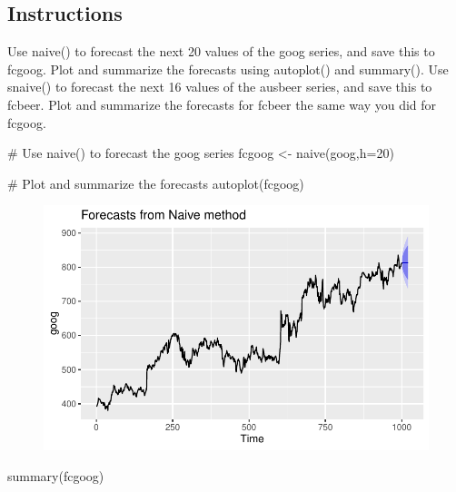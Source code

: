 \documentclass[
  letterpaper,
  DIV=11,
  numbers=noendperiod]{scrartcl}
\newenvironment{Shaded}{\begin{snugshade}}{\end{snugshade}}
\newcommand{\AttributeTok}[1]{\textcolor[rgb]{0.40,0.45,0.13}{#1}}
\newcommand{\CommentTok}[1]{\textcolor[rgb]{0.37,0.37,0.37}{#1}}
\newcommand{\DecValTok}[1]{\textcolor[rgb]{0.68,0.00,0.00}{#1}}
\newcommand{\FunctionTok}[1]{\textcolor[rgb]{0.28,0.35,0.67}{#1}}
\newcommand{\NormalTok}[1]{\textcolor[rgb]{0.00,0.23,0.31}{#1}}
\newcommand{\OtherTok}[1]{\textcolor[rgb]{0.00,0.23,0.31}{#1}}
\begin{document}
\hypertarget{instructions-4}{%
\subsection{Instructions}\label{instructions-4}}

Use naive() to forecast the next 20 values of the goog series, and save
this to fcgoog. Plot and summarize the forecasts using autoplot() and
summary(). Use snaive() to forecast the next 16 values of the ausbeer
series, and save this to fcbeer. Plot and summarize the forecasts for
fcbeer the same way you did for fcgoog.

\begin{Shaded}
\begin{Highlighting}[]
\CommentTok{\# Use naive() to forecast the goog series}
\NormalTok{fcgoog }\OtherTok{\textless{}{-}} \FunctionTok{naive}\NormalTok{(goog,}\AttributeTok{h=}\DecValTok{20}\NormalTok{)}

\CommentTok{\# Plot and summarize the forecasts}
\FunctionTok{autoplot}\NormalTok{(fcgoog)}
\end{Highlighting}
\end{Shaded}

\begin{figure}[H]

{\centering \includegraphics{forecasting_datacamp_ex_files/figure-pdf/unnamed-chunk-7-1.pdf}

}

\end{figure}

\begin{Shaded}
\begin{Highlighting}[]
\FunctionTok{summary}\NormalTok{(fcgoog)}
\end{Highlighting}
\end{Shaded}
\end{document}
